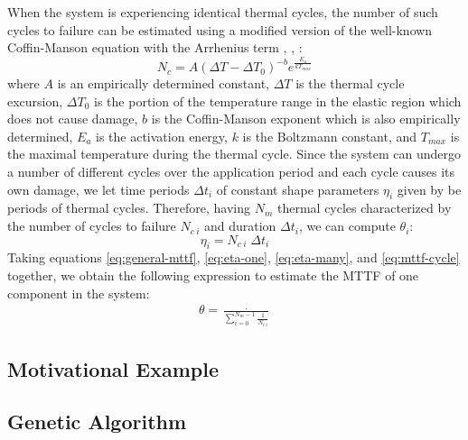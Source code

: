 When the system is experiencing identical thermal cycles, the number of such cycles to failure can be estimated using a modified version of the well-known Coffin-Manson equation with the Arrhenius term \cite{jedec2010}, \cite{xiang2010}, \cite{ciappa2003}:
\begin{equation} \label{eq:cycles-to-failure}
  N_c = A (\Delta T - \Delta T_0)^{-b} e^{\frac{E_a}{k T_{max}}}
\end{equation}
where $A$ is an empirically determined constant, $\Delta T$ is the thermal cycle excursion, $\Delta T_0$ is the portion of the temperature range in the elastic region which does not cause damage, $b$ is the Coffin-Manson exponent which is also empirically determined, $E_{a}$ is the activation energy, $k$ is the Boltzmann constant, and $T_{max}$ is the maximal temperature during the thermal cycle. Since the system can undergo a number of different cycles over the application period and each cycle causes its own damage, we let time periods $\Delta t_i$ of constant shape parameters $\eta_i$ given by  be periods of thermal cycles. Therefore, having $N_m$ thermal cycles characterized by the number of cycles to failure $N_{c\:i}$ and duration $\Delta t_i$, we can compute $\theta_i$:
\begin{equation} \label{eq:mttf-cycle}
  \eta_i = N_{c \: i} \; \Delta t_i
\end{equation}
Taking equations \eqref{eq:general-mttf}, \eqref{eq:eta-one}, \eqref{eq:eta-many}, and \eqref{eq:mttf-cycle} together, we obtain the following expression to estimate the MTTF of one component in the system:
\begin{align} \label{eq:one-mttf}
  \theta = \frac{\period}{\sum_{i=0}^{N_m - 1} \frac{1}{N_{c \: i}}}
\end{align}

\subsection{Motivational Example} \label{sec:motivation}


\subsection{Genetic Algorithm}

